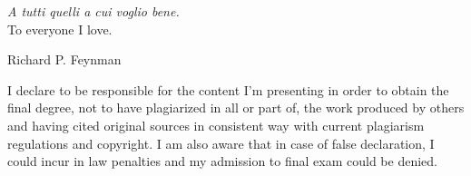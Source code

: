 \thispagestyle{empty}

\vspace*{6cm}
\begin{flushright}
	\textit{A tutti quelli a cui voglio bene.}\\
	To everyone I love.
\end{flushright}
\vspace{.5cm}
\begin{flushright}
	\textit{}
	
	\textemdash{} Richard P. Feynman
\end{flushright}
\vfill
\vfill
\begin{center}
	\small
	I declare to be responsible for the content I'm presenting in order to
	obtain the final degree, not to have plagiarized in all or part of, the
	work produced by others and having cited original sources in consistent
	way with current plagiarism regulations and copyright. I am also aware
	that in case of false declaration, I could incur in law penalties and my
	admission to final exam could be denied.
\end{center}